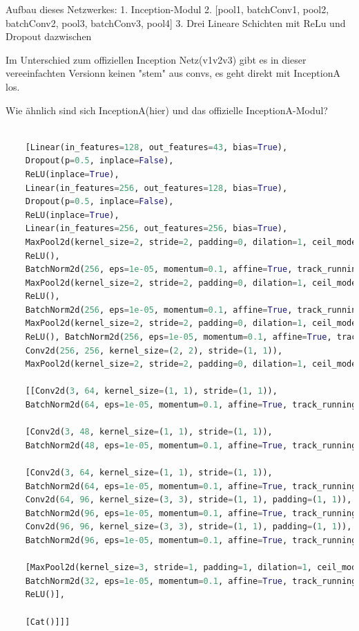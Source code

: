 \documentclass[twoside, 12pt,a4paper]{article}
\numberwithin{equation}{section}
\begin{document}
	Aufbau dieses Netzwerkes:
	 1. Inception-Modul
	 2. [pool1, batchConv1, pool2, batchConv2, pool3, batchConv3, pool4]
	 3. Drei Lineare Schichten mit ReLu und Dropout dazwischen
	
	Im Unterschied zum offiziellen Inception Netz(v1v2v3) gibt es in dieser 
	 vereeinfachten Versionn keinen "stem" aus convs, 
	 es geht direkt mit InceptionA los.
	
	 Wie ähnlich sind sich InceptionA(hier) und das offizielle InceptionA-Modul?
	\begin{lstlisting}[language=Python, caption=Reversed Model incv3]
	
	[Linear(in_features=128, out_features=43, bias=True), 
	Dropout(p=0.5, inplace=False), 
	ReLU(inplace=True), 
	Linear(in_features=256, out_features=128, bias=True), 
	Dropout(p=0.5, inplace=False), 
	ReLU(inplace=True), 
	Linear(in_features=256, out_features=256, bias=True), 
	MaxPool2d(kernel_size=2, stride=2, padding=0, dilation=1, ceil_mode=False), 
	ReLU(), 
	BatchNorm2d(256, eps=1e-05, momentum=0.1, affine=True, track_running_stats=True), Conv2d(256, 256, kernel_size=(2, 2), stride=(1, 1)), 
	MaxPool2d(kernel_size=2, stride=2, padding=0, dilation=1, ceil_mode=False), 
	ReLU(), 
	BatchNorm2d(256, eps=1e-05, momentum=0.1, affine=True, track_running_stats=True), Conv2d(256, 256, kernel_size=(2, 2), stride=(1, 1)), 
	MaxPool2d(kernel_size=2, stride=2, padding=0, dilation=1, ceil_mode=False), 
	ReLU(), BatchNorm2d(256, eps=1e-05, momentum=0.1, affine=True, track_running_stats=True), 
	Conv2d(256, 256, kernel_size=(2, 2), stride=(1, 1)), 
	MaxPool2d(kernel_size=2, stride=2, padding=0, dilation=1, ceil_mode=False),
	
	[[Conv2d(3, 64, kernel_size=(1, 1), stride=(1, 1)), 
	BatchNorm2d(64, eps=1e-05, momentum=0.1, affine=True, track_running_stats=True), ReLU()], 
	
	[Conv2d(3, 48, kernel_size=(1, 1), stride=(1, 1)), 
	BatchNorm2d(48, eps=1e-05, momentum=0.1, affine=True, track_running_stats=True), ReLU(), Conv2d(48, 64, kernel_size=(5, 5), stride=(1, 1), padding=(2, 2)), BatchNorm2d(64, eps=1e-05, momentum=0.1, affine=True, track_running_stats=True), ReLU()], 
	
	[Conv2d(3, 64, kernel_size=(1, 1), stride=(1, 1)), 
	BatchNorm2d(64, eps=1e-05, momentum=0.1, affine=True, track_running_stats=True), ReLU(), 
	Conv2d(64, 96, kernel_size=(3, 3), stride=(1, 1), padding=(1, 1)), 
	BatchNorm2d(96, eps=1e-05, momentum=0.1, affine=True, track_running_stats=True), ReLU(), 
	Conv2d(96, 96, kernel_size=(3, 3), stride=(1, 1), padding=(1, 1)), 
	BatchNorm2d(96, eps=1e-05, momentum=0.1, affine=True, track_running_stats=True), ReLU()], 
	
	[MaxPool2d(kernel_size=3, stride=1, padding=1, dilation=1, ceil_mode=False), Conv2d(3, 32, kernel_size=(1, 1), stride=(1, 1)), 
	BatchNorm2d(32, eps=1e-05, momentum=0.1, affine=True, track_running_stats=True), 
	ReLU()], 
	
	[Cat()]]]
	\end{lstlisting}
\end{document}
